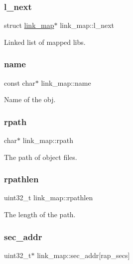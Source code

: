 \subsubsection{\texorpdfstring{l\_next}{l\_next}}
{\footnotesize\ttfamily struct \mbox{\hyperlink{structlink__map}{link\+\_\+map}}$\ast$ link\+\_\+map\+::l\+\_\+next}

Linked list of mapped libs. \mbox{\label{structlink__map_ac2e603e83cf4ca7e1b8a12c0c5e05b16}} 
\subsubsection{\texorpdfstring{name}{name}}
{\footnotesize\ttfamily const char$\ast$ link\+\_\+map\+::name}

Name of the obj. \mbox{\label{structlink__map_a8c143a0fe25c2b89bc00cfb25aa29009}} 
\subsubsection{\texorpdfstring{rpath}{rpath}}
{\footnotesize\ttfamily char$\ast$ link\+\_\+map\+::rpath}

The path of object files. \mbox{\label{structlink__map_a99e44b8c98d13eae0ec8e65d0a80917b}} 
\subsubsection{\texorpdfstring{rpathlen}{rpathlen}}
{\footnotesize\ttfamily uint32\+\_\+t link\+\_\+map\+::rpathlen}

The length of the path. \mbox{\label{structlink__map_ab5a1b77b9948416f1366596cf7096244}} 
\subsubsection{\texorpdfstring{sec\_addr}{sec\_addr}}
{\footnotesize\ttfamily uint32\+\_\+t$\ast$ link\+\_\+map\+::sec\+\_\+addr\mbox{[}rap\+\_\+secs\mbox{]}}

